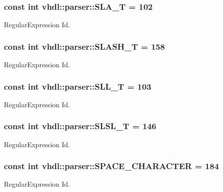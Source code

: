 \subsubsection[{S\+L\+A\+\_\+\+T}]{\setlength{\rightskip}{0pt plus 5cm}const int vhdl\+::parser\+::\+S\+L\+A\+\_\+\+T = 102}\label{namespacevhdl_1_1parser_abc3db8b1459661dec018d8725844f642}
Regular\+Expression Id. \hypertarget{namespacevhdl_1_1parser_a6a1be33a375056ee3a04ee04a316e4d2}{}
\subsubsection[{S\+L\+A\+S\+H\+\_\+\+T}]{\setlength{\rightskip}{0pt plus 5cm}const int vhdl\+::parser\+::\+S\+L\+A\+S\+H\+\_\+\+T = 158}\label{namespacevhdl_1_1parser_a6a1be33a375056ee3a04ee04a316e4d2}
Regular\+Expression Id. \hypertarget{namespacevhdl_1_1parser_ad382979cba2dd76d40c8601218592bbf}{}
\subsubsection[{S\+L\+L\+\_\+\+T}]{\setlength{\rightskip}{0pt plus 5cm}const int vhdl\+::parser\+::\+S\+L\+L\+\_\+\+T = 103}\label{namespacevhdl_1_1parser_ad382979cba2dd76d40c8601218592bbf}
Regular\+Expression Id. \hypertarget{namespacevhdl_1_1parser_a39371488efab3cfc150f7901506a8eb1}{}
\subsubsection[{S\+L\+S\+L\+\_\+\+T}]{\setlength{\rightskip}{0pt plus 5cm}const int vhdl\+::parser\+::\+S\+L\+S\+L\+\_\+\+T = 146}\label{namespacevhdl_1_1parser_a39371488efab3cfc150f7901506a8eb1}
Regular\+Expression Id. \hypertarget{namespacevhdl_1_1parser_afc31ff392d103a6bb04fd649c21d8e2e}{}
\subsubsection[{S\+P\+A\+C\+E\+\_\+\+C\+H\+A\+R\+A\+C\+T\+E\+R}]{\setlength{\rightskip}{0pt plus 5cm}const int vhdl\+::parser\+::\+S\+P\+A\+C\+E\+\_\+\+C\+H\+A\+R\+A\+C\+T\+E\+R = 184}\label{namespacevhdl_1_1parser_afc31ff392d103a6bb04fd649c21d8e2e}
Regular\+Expression Id. \hypertarget{namespacevhdl_1_1parser_a00b41dcd266524abde504c21f2fefb25}{}
